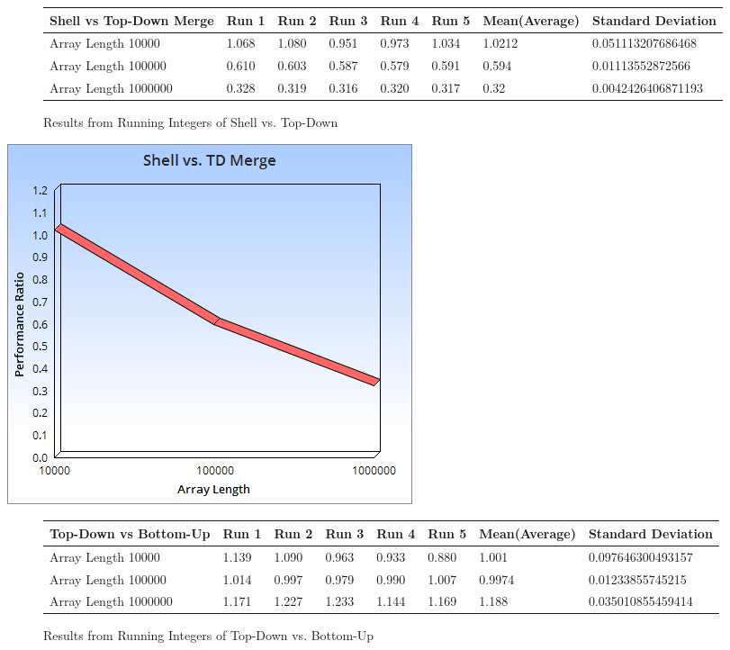 \documentclass{article}
\begin{document}
\begin{figure}[H]
\centering
\begin{adjustwidth}{-3.4cm}{}
\begin{tabular}{| l | l | l | l | l | l | l | l |}
\hline
Shell vs Top-Down Merge & Run 1 & Run 2 & Run 3 & Run 4 & Run 5 & Mean(Average) & Standard Deviation\\ \hline
Array Length 10000 & 1.068 & 1.080 & 0.951 & 0.973 & 1.034 & 1.0212 & 0.051113207686468 \\ \hline
Array Length 100000 & 0.610 & 0.603 & 0.587 & 0.579  & 0.591 & 0.594 & 0.01113552872566 \\ \hline
Array Length 1000000 & 0.328 & 0.319 & 0.316 & 0.320 & 0.317 & 0.32 & 0.0042426406871193  \\ \hline
\end{tabular}
\caption{Results from Running  Integers of Shell vs. Top-Down}
\end{adjustwidth}
\end{figure}
\includegraphics[scale=0.5]{Integer3.png}
\begin{figure}[H]
\centering
\begin{adjustwidth}{-3.4cm}{}
\begin{tabular}{| l | l | l | l | l | l | l | l |}
\hline
Top-Down vs Bottom-Up & Run 1 & Run 2 & Run 3 & Run 4 & Run 5 & Mean(Average) & Standard Deviation\\ \hline
Array Length 10000 & 1.139 & 1.090 & 0.963 & 0.933 & 0.880 & 1.001 & 0.097646300493157 \\ \hline
Array Length 100000 & 1.014 & 0.997 & 0.979 & 0.990 & 1.007 & 0.9974 & 0.01233855745215  \\ \hline
Array Length 1000000 & 1.171& 1.227 & 1.233 & 1.144 & 1.169 & 1.188 & 0.035010855459414 \\ \hline
\end{tabular}
\caption{Results from Running  Integers of Top-Down vs. Bottom-Up}
\end{adjustwidth}
\end{figure}
\end{document}
